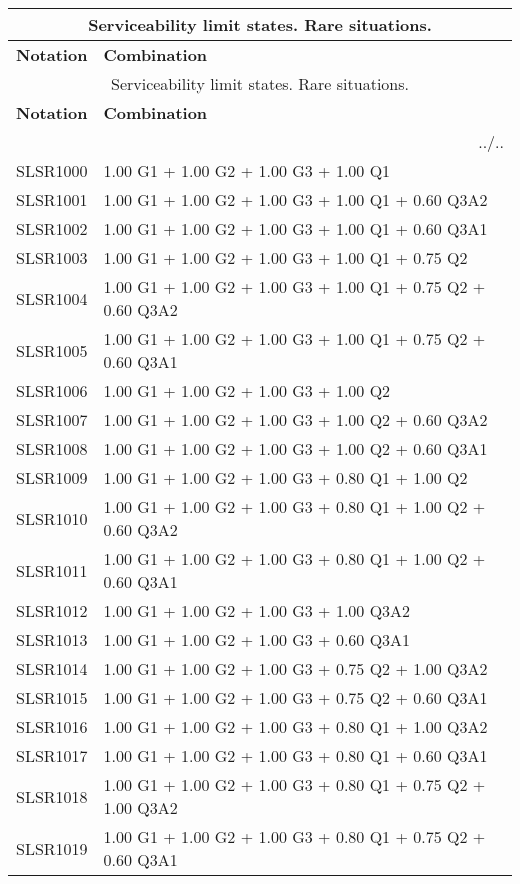 \begin{center}
\begin{small}
\begin{longtable}{|l|p{10cm}|}
\hline
\multicolumn{2}{|c|}{Serviceability limit states. Rare situations.}\\
\hline
\textbf{Notation} & \textbf{Combination} \\
\hline
\endfirsthead
\hline
\multicolumn{2}{|c|}{Serviceability limit states. Rare situations.}\\
\hline
\textbf{Notation} & \textbf{Combination} \\
\hline
\endhead
\hline \multicolumn{2}{|r|}{{../..}} \\ \hline
\endfoot
\hline
\endlastfoot
SLSR1000 & 1.00 G1 + 1.00 G2 + 1.00 G3 + 1.00 Q1\\
SLSR1001 & 1.00 G1 + 1.00 G2 + 1.00 G3 + 1.00 Q1 + 0.60 Q3A2\\
SLSR1002 & 1.00 G1 + 1.00 G2 + 1.00 G3 + 1.00 Q1 + 0.60 Q3A1\\
SLSR1003 & 1.00 G1 + 1.00 G2 + 1.00 G3 + 1.00 Q1 + 0.75 Q2\\
SLSR1004 & 1.00 G1 + 1.00 G2 + 1.00 G3 + 1.00 Q1 + 0.75 Q2 + 0.60 Q3A2\\
SLSR1005 & 1.00 G1 + 1.00 G2 + 1.00 G3 + 1.00 Q1 + 0.75 Q2 + 0.60 Q3A1\\
SLSR1006 & 1.00 G1 + 1.00 G2 + 1.00 G3 + 1.00 Q2\\
SLSR1007 & 1.00 G1 + 1.00 G2 + 1.00 G3 + 1.00 Q2 + 0.60 Q3A2\\
SLSR1008 & 1.00 G1 + 1.00 G2 + 1.00 G3 + 1.00 Q2 + 0.60 Q3A1\\
SLSR1009 & 1.00 G1 + 1.00 G2 + 1.00 G3 + 0.80 Q1 + 1.00 Q2\\
SLSR1010 & 1.00 G1 + 1.00 G2 + 1.00 G3 + 0.80 Q1 + 1.00 Q2 + 0.60 Q3A2\\
SLSR1011 & 1.00 G1 + 1.00 G2 + 1.00 G3 + 0.80 Q1 + 1.00 Q2 + 0.60 Q3A1\\
SLSR1012 & 1.00 G1 + 1.00 G2 + 1.00 G3 + 1.00 Q3A2\\
SLSR1013 & 1.00 G1 + 1.00 G2 + 1.00 G3 + 0.60 Q3A1\\
SLSR1014 & 1.00 G1 + 1.00 G2 + 1.00 G3 + 0.75 Q2 + 1.00 Q3A2\\
SLSR1015 & 1.00 G1 + 1.00 G2 + 1.00 G3 + 0.75 Q2 + 0.60 Q3A1\\
SLSR1016 & 1.00 G1 + 1.00 G2 + 1.00 G3 + 0.80 Q1 + 1.00 Q3A2\\
SLSR1017 & 1.00 G1 + 1.00 G2 + 1.00 G3 + 0.80 Q1 + 0.60 Q3A1\\
SLSR1018 & 1.00 G1 + 1.00 G2 + 1.00 G3 + 0.80 Q1 + 0.75 Q2 + 1.00 Q3A2\\
SLSR1019 & 1.00 G1 + 1.00 G2 + 1.00 G3 + 0.80 Q1 + 0.75 Q2 + 0.60 Q3A1\\
\hline
\end{longtable}
\end{small}
\end{center}
